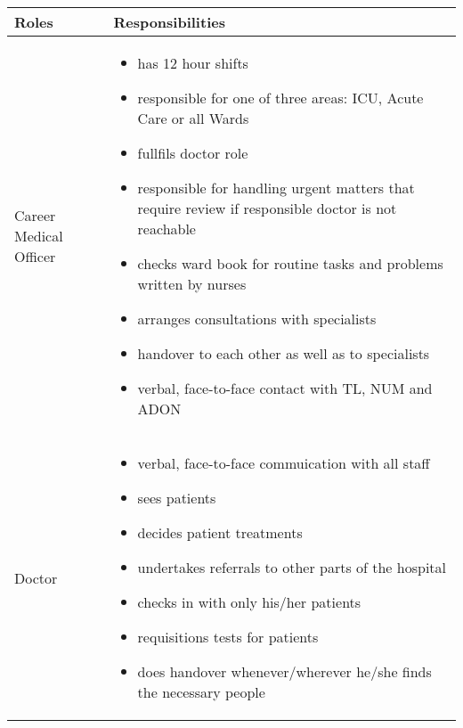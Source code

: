 \newpage

\hfil\begin{tabular}{|p{5cm}|p{11cm}|}
\hline
{\hfil\bf Roles} & {\hfil\bf Responsibilities} \\
\hline
Career Medical Officer & \vspace{-5mm}\begin{itemize}
\item has 12 hour shifts
\item responsible for one of three areas: ICU, Acute Care or all Wards
\item fullfils doctor role
\item responsible for handling urgent matters that require review if responsible doctor is not reachable
\item checks ward book for routine tasks and problems written by nurses
\item arranges consultations with specialists
\item handover to each other as well as to specialists
\item verbal, face-to-face contact with TL, NUM and ADON
\end{itemize} \\
\hline
Doctor & \vspace{-5mm}\begin{itemize}
\item verbal, face-to-face commuication with all staff
\item sees patients
\item decides patient treatments
\item undertakes referrals to other parts of the hospital
\item checks in with only his/her patients
\item requisitions tests for patients
\item does handover whenever/wherever he/she finds the necessary people
\end{itemize} \\
\hline
\end{tabular}

\newpage

